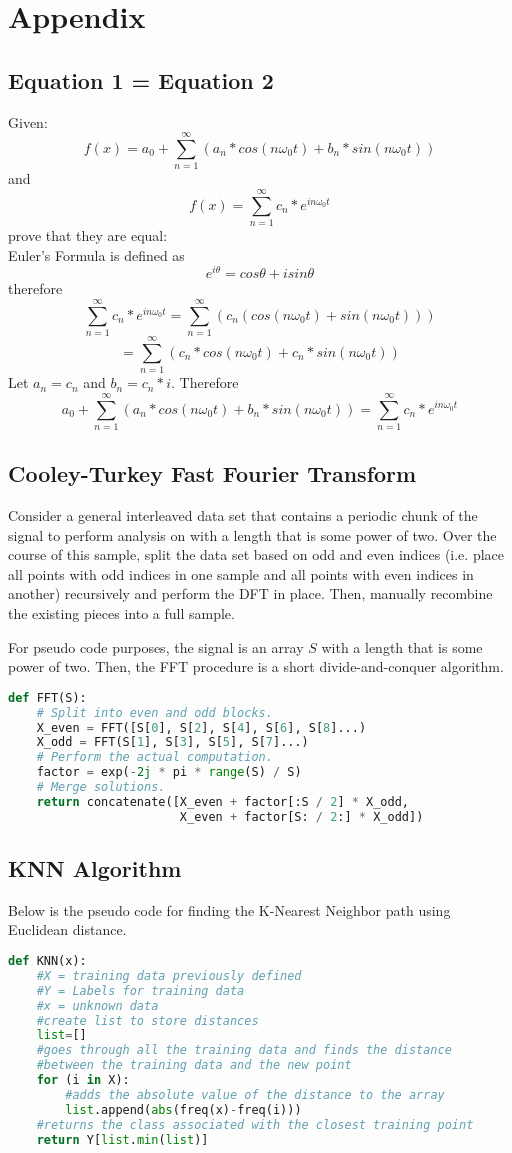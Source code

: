 \documentclass{article}
\begin{document}
\appendix
\section{Appendix}
\subsection{Equation 1 = Equation 2}
Given: $$f(x) = a_0 + \sum_{n=1}^{\infty}(a_n*cos(n\omega_0t) +b_n*sin(n\omega_0t)) $$
and     $$f(x)=\sum_{n=1}^{\infty}c_n*e^{in\omega_0t}$$
prove that they are equal:\\
Euler's Formula is defined as $$e^{i\theta}=cos\theta+isin\theta$$
therefore $$\sum_{n=1}^{\infty}c_n*e^{in\omega_0t} = \sum_{n=1}^{\infty}(c_n(cos(n\omega_0t) +sin(n\omega_0t)))$$
$$ = \sum_{n=1}^{\infty} (c_n * cos(n\omega_0t) +c_n * sin(n\omega_0t))$$
Let $a_n=c_n$ and $b_n=c_n * i$. Therefore
$$a_0 + \sum_{n=1}^{\infty}(a_n*cos(n\omega_0t) +b_n*sin(n\omega_0t))=\sum_{n=1}^{\infty}c_n*e^{in\omega_0t}$$
\subsection{Cooley-Turkey Fast Fourier Transform}
Consider a general interleaved data set that contains a periodic chunk of the signal to perform analysis on with a length that is some power of two. Over the course of this sample, split the data set based on odd and even indices (i.e. place all points with odd indices in one sample and all points with even indices in another) recursively and perform the DFT in place. Then, manually recombine the existing pieces into a full sample.

For pseudo code purposes, the signal is an array $S$ with a length that is some power of two. Then, the FFT procedure is a short divide-and-conquer algorithm. 
\begin{lstlisting}[language=Python]
def FFT(S):
    # Split into even and odd blocks.
    X_even = FFT([S[0], S[2], S[4], S[6], S[8]...)
    X_odd = FFT(S[1], S[3], S[5], S[7]...)
    # Perform the actual computation.
    factor = exp(-2j * pi * range(S) / S)
    # Merge solutions.
    return concatenate([X_even + factor[:S / 2] * X_odd,
                        X_even + factor[S: / 2:] * X_odd])
\end{lstlisting}

\subsection{KNN Algorithm}
Below is the pseudo code for finding the K-Nearest Neighbor path using Euclidean distance.
\begin{lstlisting}[language=Python]
def KNN(x):
    #X = training data previously defined
    #Y = Labels for training data
    #x = unknown data
    #create list to store distances
    list=[]
    #goes through all the training data and finds the distance
    #between the training data and the new point
    for (i in X):
        #adds the absolute value of the distance to the array
        list.append(abs(freq(x)-freq(i)))
    #returns the class associated with the closest training point
    return Y[list.min(list)]
    
\end{lstlisting}
\end{document}
